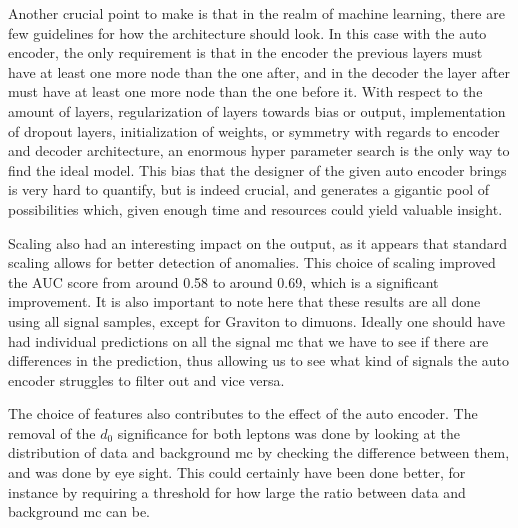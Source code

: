 \documentclass[ reprint, amsmath,amssymb, aps, nofootinbib]{revtex4-2}
\begin{document}
Another crucial point to make is that in the realm of machine learning, there are few guidelines for how the architecture should look. In this case with the auto encoder, the only requirement is that in the encoder the previous layers must have at least one more node than the one after, and in the decoder the layer after must have at least one more node than the one before it. With respect to the amount of layers, regularization of layers towards bias or output, implementation of dropout layers, initialization of weights, or symmetry with regards to encoder and decoder architecture, an enormous hyper parameter search is the only way to find the ideal model. This bias that the designer of the given auto encoder brings is very hard to quantify, but is indeed crucial, and generates a gigantic pool of possibilities which, given enough time and resources could yield valuable insight. \par \par

Scaling also had an interesting impact on the output, as it appears that standard scaling allows for better detection of anomalies. This choice of scaling improved the AUC score from around 0.58 to around 0.69, which is a significant improvement.
It is also important to note here that these results are all done using all signal samples, except for Graviton to dimuons. Ideally one should have had individual predictions on all the signal mc that we have to see if there are differences in the prediction, thus allowing us to see what kind of signals the auto encoder struggles to filter out and vice versa. \par \par

The choice of features also contributes to the effect of the auto encoder. The removal of the $d_0$ significance for both leptons was done by looking at the distribution of data and background mc by checking the difference between them, and was done by eye sight. This could certainly have been done better, for instance by requiring a threshold for how large the ratio between data and background mc can be. \par \par

\end{document}
